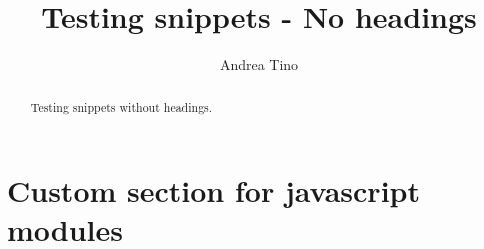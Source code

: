 \documentclass{article}
\begin{document}
\title{Testing snippets - No headings}
\author{Andrea Tino}

\maketitle

\begin{abstract}
Testing snippets without headings.
\end{abstract}

\section{Custom section for javascript modules}

\end{document}
